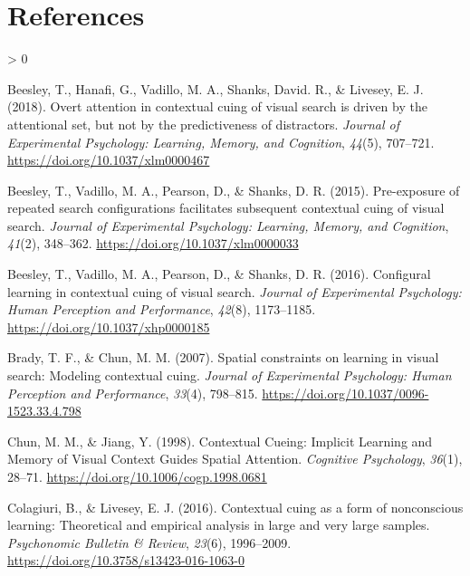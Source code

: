 \documentclass[
  english,
  man,floatsintext]{apa7}
\newlength{\cslhangindent}
\newenvironment{CSLReferences}[2] %
 {%
  \setlength{\parindent}{0pt}
  \ifodd #1 \everypar{\setlength{\hangindent}{\cslhangindent}}\ignorespaces\fi
  \ifnum #2 > 0
  \setlength{\parskip}{#2\baselineskip}
  \fi
 }%
 {}
\begin{document}
\newpage

\hypertarget{references}{%
\section*{References}\label{references}}

\hypertarget{refs}{}
\begin{CSLReferences}{1}{0}
\leavevmode\hypertarget{ref-beesley2018}{}%
Beesley, T., Hanafi, G., Vadillo, M. A., Shanks, David. R., \& Livesey, E. J. (2018). Overt attention in contextual cuing of visual search is driven by the attentional set, but not by the predictiveness of distractors. \emph{Journal of Experimental Psychology: Learning, Memory, and Cognition}, \emph{44}(5), 707--721. \url{https://doi.org/10.1037/xlm0000467}

\leavevmode\hypertarget{ref-beesley2015b}{}%
Beesley, T., Vadillo, M. A., Pearson, D., \& Shanks, D. R. (2015). Pre-exposure of repeated search configurations facilitates subsequent contextual cuing of visual search. \emph{Journal of Experimental Psychology: Learning, Memory, and Cognition}, \emph{41}(2), 348--362. \url{https://doi.org/10.1037/xlm0000033}

\leavevmode\hypertarget{ref-beesley2016}{}%
Beesley, T., Vadillo, M. A., Pearson, D., \& Shanks, D. R. (2016). Configural learning in contextual cuing of visual search. \emph{Journal of Experimental Psychology: Human Perception and Performance}, \emph{42}(8), 1173--1185. \url{https://doi.org/10.1037/xhp0000185}

\leavevmode\hypertarget{ref-brady2007}{}%
Brady, T. F., \& Chun, M. M. (2007). Spatial constraints on learning in visual search: {Modeling} contextual cuing. \emph{Journal of Experimental Psychology: Human Perception and Performance}, \emph{33}(4), 798--815. \url{https://doi.org/10.1037/0096-1523.33.4.798}

\leavevmode\hypertarget{ref-chun1998}{}%
Chun, M. M., \& Jiang, Y. (1998). Contextual {Cueing}: {Implicit Learning} and {Memory} of {Visual Context Guides Spatial Attention}. \emph{Cognitive Psychology}, \emph{36}(1), 28--71. \url{https://doi.org/10.1006/cogp.1998.0681}

\leavevmode\hypertarget{ref-colagiuri2016}{}%
Colagiuri, B., \& Livesey, E. J. (2016). Contextual cuing as a form of nonconscious learning: {Theoretical} and empirical analysis in large and very large samples. \emph{Psychonomic Bulletin \& Review}, \emph{23}(6), 1996--2009. \url{https://doi.org/10.3758/s13423-016-1063-0}


\end{CSLReferences}
\end{document}
